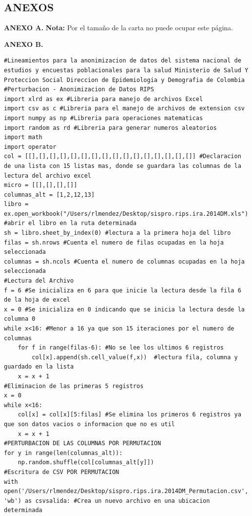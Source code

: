 \documentclass[a4paper,openright,12pt]{book}
\theoremstyle{definition}
\theoremstyle{remark}
\begin{document}
\begin{center}
 \chapter{ANEXOS}\label{cap.anexos}
\end{center}
\textbf{ANEXO A.}
 \textbf{Nota:} Por el tamaño de la carta no puede ocupar este página.
	\begin{center}
     
	\end{center}  
\textbf{ANEXO B.} 
    \begin{verbatim}
#Lineamientos para la anonimizacion de datos del sistema nacional de estudios y encuestas poblacionales para la salud Ministerio de Salud Y Proteccion Social Direccion de Epidemiologia y Demografia de Colombia
#Perturbacion - Anonimizacion de Datos RIPS
import xlrd as ex #Libreria para manejo de archivos Excel
import csv as c #Libreria para el manejo de archivos de extension csv
import numpy as np #Libreria para operaciones matematicas
import random as rd #Libreria para generar numeros aleatorios
import math
import operator
col = [[],[],[],[],[],[],[],[],[],[],[],[],[],[],[],[]] #Declaracion de una lista con 15 listas mas, donde se guardara las columnas de la lectura del archivo excel
micro = [[],[],[],[]]
columnas_alt = [1,2,12,13]
libro = ex.open_workbook("/Users/rlmendez/Desktop/sispro.rips.ira.2014DM.xls") #abrir el libro en la ruta determinada
sh = libro.sheet_by_index(0) #lectura a la primera hoja del libro
filas = sh.nrows #Cuenta el numero de filas ocupadas en la hoja seleccionada
columnas = sh.ncols #Cuenta el numero de columnas ocupadas en la hoja seleccionada
#Lectura del Archivo
f = 6 #Se inicializa en 6 para que inicie la lectura desde la fila 6 de la hoja de excel
x = 0 #Se inicializa en 0 indicando que se inicia la lectura desde la columna 0
while x<16: #Menor a 16 ya que son 15 iteraciones por el numero de columnas
	for f in range(filas-6): #No se lee los ultimos 6 registros
		col[x].append(sh.cell_value(f,x))  #lectura fila, columna y guardado en la lista
	x = x + 1
#Eliminacion de las primeras 5 registros
x = 0 
while x<16:
	col[x] = col[x][5:filas] #Se elimina los primeros 6 registros ya que son datos vacios o informacion que no es util
	x = x + 1
#PERTURBACION DE LAS COLUMNAS POR PERMUTACION
for y in range(len(columnas_alt)):
	np.random.shuffle(col[columnas_alt[y]])
#Escritura de CSV POR PERMUTACION
with open('/Users/rlmendez/Desktop/sispro.rips.ira.2014DM_Permutacion.csv', 'wb') as csvsalida: #Crea un nuevo archivo en una ubicacion determinada

\end{verbatim}
\end{document}
